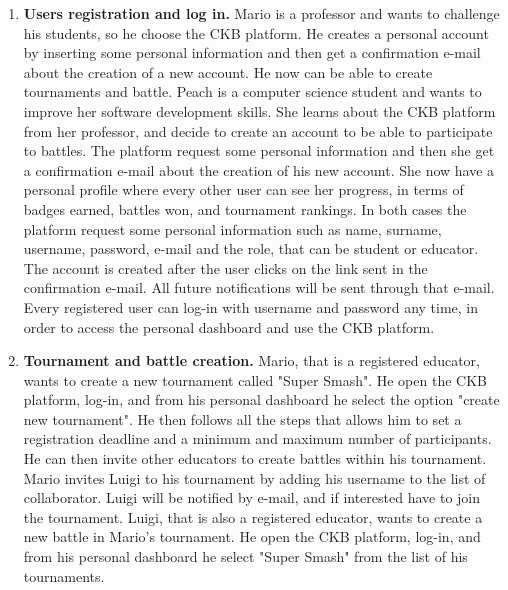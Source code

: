 \begin{enumerate}[label=\textbf{SC.\arabic*}]
    \item {} \textbf{Users registration and log in.} \newline
    Mario is a professor and wants to challenge his students, so he choose the CKB platform. He creates a personal account by inserting some personal information and then get a confirmation e-mail about the creation of a new account. He now can be able to create tournaments and battle. \newline
    Peach is a computer science student and wants to improve her software development skills. She learns about the CKB platform from her professor, and decide to create an account to be able to participate to battles. The platform request some personal information and then she get a confirmation e-mail about the creation of his new account. She now have a personal profile where every other user can see her progress, in terms of badges earned, battles won, and tournament rankings. \newline
    In both cases the platform request some personal information such as name, surname, username, password, e-mail and the role, that can be student or educator. The account is created after the user clicks on the link sent in the confirmation e-mail. All future notifications will be sent through that e-mail. \newline
    Every registered user can log-in with username and password any time, in order to access the personal dashboard and use the CKB platform.
    \item {} \textbf{Tournament and battle creation.} \newline
    Mario, that is a registered educator, wants to create a new tournament called "Super Smash". He open the CKB platform, log-in, and from his personal dashboard he select the option "create new tournament". He then follows all the steps that allows him to set a registration deadline and a minimum and maximum number of participants. He can then invite other educators to create battles within his tournament. \newline
    Mario invites Luigi to his tournament by adding his username to the list of collaborator. Luigi will be notified by e-mail, and if interested have to join the tournament. \newline
    Luigi, that is also a registered educator, wants to create a new battle in Mario's tournament. He open the CKB platform, log-in, and from his personal dashboard he select "Super Smash" from the list of his tournaments.

\end{enumerate}
